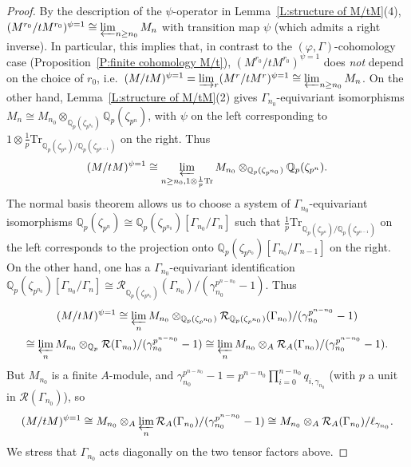 \documentclass[12pt]{article}
\theoremstyle{definition}
\numberwithin{equation}{theorem}
\newcommand{\calR}{\mathcal{R}}
\newcommand{\QQ}{\mathbb{Q}}
\def\Qp{\QQ_p}
\newcommand{\Tr}{\mathrm{Tr}}
\begin{document}
\begin{proof}
By the description of the $\psi$-operator in Lemma~\ref{L:structure of
  M/tM}(4), $(M^{r_0}/tM^{r_0})^{\psi=1} \cong \varprojlim_{n \geq
  n_0} M_n$ with transition map $\psi$ (which admits a right inverse).
In particular, this implies that, in contrast to the $(\varphi,
\Gamma)$-cohomology case (Proposition~\ref{P:finite cohomology M/t}),
$(M^{r_0}/tM^{r_0})^{\psi=1}$ does \emph{not} depend on the choice of
$r_0$, i.e.\ $(M/tM)^{\psi=1} = \varinjlim_r (M^r/tM^r)^{\psi=1} \cong
\varprojlim_{n \geq n_0} M_n$.  On the other hand,
Lemma~\ref{L:structure of M/tM}(2) gives $\Gamma_{n_0}$-equivariant
isomorphisms $M_n \cong M_{n_0} \otimes_{\Qp(\zeta_{p^{n_0}})}
\Qp(\zeta_{p^n})$, with $\psi$ on the left corresponding to $1 \otimes
\frac1p\Tr_{\Qp(\zeta_{p^n})/\Qp(\zeta_{p^{n-1}})}$ on the right.
Thus
\[
(M/tM)^{\psi=1} \cong \varprojlim_{n \geq n_0,1\otimes\frac1p\Tr}
M_{n_0} \otimes_{\Qp(\zeta_{p^{n_0}})} \Qp(\zeta_{p^n}).
\]
The normal basis theorem allows us to choose a system of
$\Gamma_{n_0}$-equivariant isomorphisms $\Qp(\zeta_{p^n}) \cong
\Qp(\zeta_{p^{n_0}})[\Gamma_{n_0}/\Gamma_n]$ such that
$\frac1p\Tr_{\Qp(\zeta_{p^n})/\Qp(\zeta_{p^{n-1}})}$ on the left
corresponds to the projection onto
$\Qp(\zeta_{p^{n_0}})[\Gamma_{n_0}/\Gamma_{n-1}]$ on the right.
On the other hand, one has a $\Gamma_{n_0}$-equivariant identification
$\Qp(\zeta_{p^{n_0}})[\Gamma_{n_0}/\Gamma_n] \cong
\calR_{\Qp(\zeta_{p^{n_0}})}(\Gamma_{n_0})/(\gamma_{n_0}^{p^{n-n_0}}-1)$.
Thus
\begin{multline*}
(M/tM)^{\psi=1}
\cong
\varprojlim_n
M_{n_0} \otimes_{\Qp(\zeta_{p^{n_0}})}
  \calR_{\Qp(\zeta_{p^{n_0}})}(\Gamma_{n_0})/(\gamma_{n_0}^{p^{n-n_0}}-1) \\
\cong
\varprojlim_n
M_{n_0} \otimes_{\Qp}
  \calR(\Gamma_{n_0})/(\gamma_{n_0}^{p^{n-n_0}}-1)
\cong
\varprojlim_n
M_{n_0} \otimes_A
  \calR_A(\Gamma_{n_0})/(\gamma_{n_0}^{p^{n-n_0}}-1).
\end{multline*}
But $M_{n_0}$ is a finite $A$-module, and $\gamma_{n_0}^{p^{n-n_0}}-1 =
p^{n-n_0}\prod_{i=0}^{n-n_0} q_{i,\gamma_{n_0}}$ (with $p$ a unit in
$\calR(\Gamma_{n_0})$), so
\[
(M/tM)^{\psi=1}
\cong
M_{n_0} \otimes_A
  \varprojlim_n \calR_A(\Gamma_{n_0})/(\gamma_{n_0}^{p^{n-n_0}}-1)
\cong
M_{n_0} \otimes_A \calR_A(\Gamma_{n_0})/\ell_{\gamma_{n_0}}.
\]
We stress that $\Gamma_{n_0}$ acts diagonally on the two tensor
factors above.


\end{proof}
\end{document}
